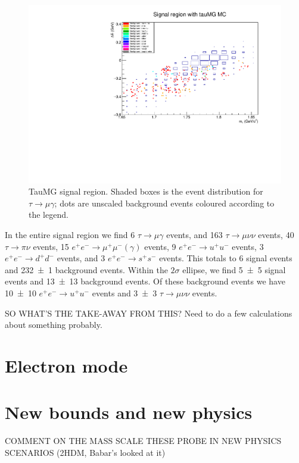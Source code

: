 \documentclass[12pt]{thesis}  %
\begin{document}
\begin{figure}[h]
\centering
\includegraphics[width=\linewidth]{images/tauMG-signalRegion.pdf}
\caption{TauMG signal region. Shaded boxes is the event distribution for $\tau\to\mu\gamma$; dots are unscaled background events coloured according to the legend.}
\label{}
\end{figure}

In the entire signal region we find 6 $\tau\to\mu\gamma$ events, and 163 $\tau\to\mu\nu\nu$ events, 40 $\tau\to\pi\nu$ events, 15 $e^+ e^-\to\mu^+\mu^-(\gamma)$ events, 9 $e^+ e^-\to u^+ u^-$ events, 3 $e^+ e^-\to d^+ d^-$ events, and 3 $e^+ e^-\to s^+ s^-$ events. This totals to 6 signal events and \num{232 \pm 1} background events. Within the $2\sigma$ ellipse, we find \num{5 \pm 5} signal events and \num{13 \pm 13} background events. Of these background events we have \num{10 \pm 10} $e^+ e^-\to u^+ u^-$ events and \num{3 \pm 3} $\tau\to\mu\nu\nu$ events. 

SO WHAT'S THE TAKE-AWAY FROM THIS? Need to do a few calculations about something probably.

\section{Electron mode}


\section{New bounds and new physics}

COMMENT ON THE MASS SCALE THESE PROBE IN NEW PHYSICS SCENARIOS (2HDM, Babar's looked at it)
\end{document}
